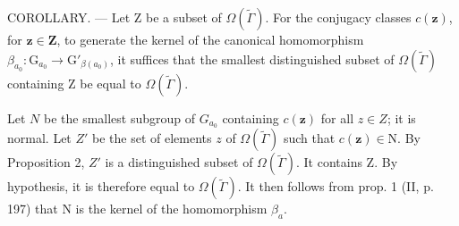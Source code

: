 COROLLARY. --- Let Z be a subset of \(\Omega(\widetilde{\Gamma})\). For the conjugacy classes \(c(\mathbf{z})\), for \(\mathbf{z} \in \mathbf{Z}\), to generate the kernel of the canonical homomorphism \(\beta_{a_0}: \mathrm{G}_{a_0} \to \mathrm{G}'_{\beta(a_0)}\), it suffices that the smallest distinguished subset of \(\Omega(\widetilde{\Gamma})\) containing Z be equal to \(\Omega(\widetilde{\Gamma})\).

Let \(N\) be the smallest subgroup of \(G_{a_{0}}\) containing \(c(\mathbf{z})\) for all \(z \in Z\); it is normal. Let \(Z'\) be the set of elements \(z\) of \(\Omega(\widetilde{\Gamma})\) such that \(c(\mathbf{z}) \in \mathrm{N}\). By Proposition 2, \(Z'\) is a distinguished subset of \(\Omega(\widetilde{\Gamma})\). It contains Z. By hypothesis, it is therefore equal to \(\Omega(\widetilde{\Gamma})\). It then follows from prop. 1 (II, p. 197) that N is the kernel of the homomorphism \(\beta_{a}\).

